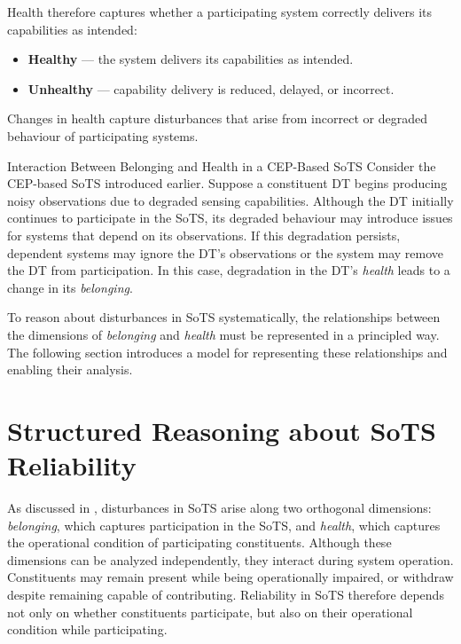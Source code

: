 Health therefore captures whether a participating system correctly delivers its capabilities as intended:

\begin{itemize}
    \item \textbf{Healthy} --- the system delivers its capabilities as intended.
    \item \textbf{Unhealthy} --- capability delivery is reduced, delayed, or incorrect.
\end{itemize}

Changes in health capture disturbances that arise from incorrect or degraded behaviour of participating systems.

\begin{runningexample}{Interaction Between Belonging and Health in a CEP-Based SoTS}
Consider the CEP-based SoTS introduced earlier. Suppose a constituent DT begins producing noisy observations due to degraded sensing capabilities. Although the DT initially continues to participate in the SoTS, its degraded behaviour may introduce issues for systems that depend on its observations. If this degradation persists, dependent systems may ignore the DT's observations or the system may remove the DT from participation. In this case, degradation in the DT's \emph{health} leads to a change in its \emph{belonging}.
\end{runningexample}

To reason about disturbances in SoTS systematically, the relationships between the dimensions of \emph{belonging} and \emph{health} must be represented in a principled way. The following section introduces a model for representing these relationships and enabling their analysis.


\section{Structured Reasoning about SoTS Reliability}

As discussed in , disturbances in SoTS arise along two orthogonal dimensions: \emph{belonging}, which captures participation in the SoTS, and \emph{health}, which captures the operational condition of participating constituents. Although these dimensions can be analyzed independently, they interact during system operation. Constituents may remain present while being operationally impaired, or withdraw despite remaining capable of contributing. Reliability in SoTS therefore depends not only on whether constituents participate, but also on their operational condition while participating.

